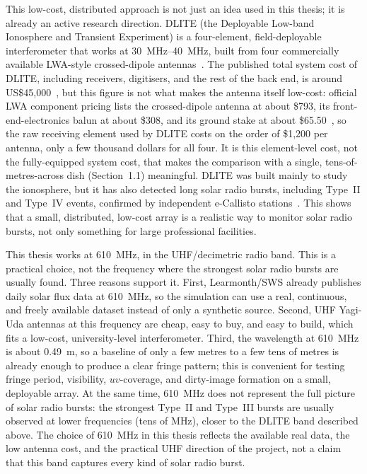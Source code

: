 This low-cost, distributed approach is not just an idea used in this thesis; it
is already an active research direction. DLITE (the Deployable Low-band
Ionosphere and Transient Experiment) is a four-element, field-deployable
interferometer that works at \SIrange{30}{40}{\mega\hertz}, built from four
commercially available LWA-style crossed-dipole antennas~\citep{carson2022dlite}.
The published total system cost of DLITE, including receivers, digitisers, and
the rest of the back end, is around US\$45{,}000~\citep{carson2022dlite}, but
this figure is not what makes the antenna itself low-cost: official LWA
component pricing lists the crossed-dipole antenna at about \$793, its
front-end-electronics balun at about \$308, and its ground stake at about
\$65.50~\citep{lwa_pricing}, so the raw receiving element used by DLITE costs
on the order of \$1{,}200 per antenna, only a few thousand dollars for all four.
It is this element-level cost, not the fully-equipped system cost, that makes
the comparison with a single, tens-of-metres-across dish (Section~1.1)
meaningful. DLITE was built mainly to study the ionosphere, but it has also
detected long solar radio bursts, including Type~II and Type~IV events,
confirmed by independent e-Callisto stations~\citep{carson2022dlite}. This
shows that a small, distributed, low-cost array is a realistic way to monitor
solar radio bursts, not only something for large professional facilities.

This thesis works at \SI{610}{\mega\hertz}, in the UHF/decimetric radio band.
This is a practical choice, not the frequency where the strongest solar radio
bursts are usually found. Three reasons support it. First, Learmonth/SWS
already publishes daily solar flux data at \SI{610}{\mega\hertz}, so the
simulation can use a real, continuous, and freely available dataset instead of
only a synthetic source. Second, UHF Yagi-Uda antennas at this frequency are
cheap, easy to buy, and easy to build, which fits a low-cost, university-level
interferometer. Third, the wavelength at \SI{610}{\mega\hertz} is about
\SI{0.49}{\metre}, so a baseline of only a few metres to a few tens of metres
is already enough to produce a clear fringe pattern; this is convenient for
testing fringe period, visibility, $uv$-coverage, and dirty-image formation on
a small, deployable array. At the same time, \SI{610}{\mega\hertz} does not
represent the full picture of solar radio bursts: the strongest Type~II and
Type~III bursts are usually observed at lower frequencies (tens of MHz),
closer to the DLITE band described above. The choice of \SI{610}{\mega\hertz}
in this thesis reflects the available real data, the low antenna cost, and the
practical UHF direction of the project, not a claim that this band captures
every kind of solar radio burst.

